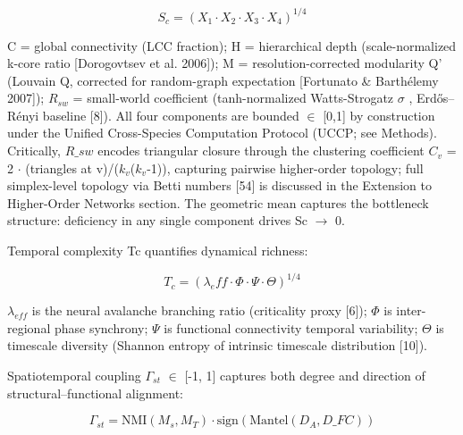\documentclass[a4paper,12pt]{article}
\begin{document}
\begin{equation}
S_c = (X_1 \cdot X_2 \cdot X_3 \cdot X_4)^{1/4} \tag{2}
\end{equation}

C = global connectivity (LCC fraction); H = hierarchical depth (scale-normalized k-core ratio [Dorogovtsev et al. 2006]); M = resolution-corrected modularity Q' (Louvain Q, corrected for random-graph expectation [Fortunato \& Barth\'elemy 2007]); $R_{sw}$ = small-world coefficient (tanh-normalized Watts-Strogatz  $\sigma$ , Erd\H{o}s--R\'enyi baseline [8]).
All four components are bounded  $\in$  [0,1] by construction under the Unified Cross-Species Computation Protocol (UCCP; see Methods).
Critically, $R\_{sw}$ encodes triangular closure through the clustering coefficient $C_{v}$ = 2 $\cdot$ (triangles at v)/($k_{v}$($k_{v}$-1)), capturing pairwise higher-order topology; full simplex-level topology via Betti numbers [54] is discussed in the Extension to Higher-Order Networks section.
The geometric mean captures the bottleneck structure: deficiency in any single component drives Sc  $\rightarrow$  0.

Temporal complexity Tc quantifies dynamical richness:

\begin{equation}
T_c = (\lambda_eff \cdot \Phi \cdot \Psi \cdot \Theta)^{1/4} \tag{3}
\end{equation}

$\lambda_{eff}$ is the neural avalanche branching ratio (criticality proxy [6]);  $\Phi$  is inter-regional phase synchrony;  $\Psi$  is functional connectivity temporal variability; $\Theta$ is timescale diversity (Shannon entropy of intrinsic timescale distribution [10]).

Spatiotemporal coupling $\Gamma_{st}$  $\in$  [-1, 1] captures both degree and direction of structural--functional alignment:

\begin{equation}
\Gamma_{st} = \text{NMI}(M_s, M_T) \cdot \text{sign}(\text{Mantel}(D_A, D\_{FC})) \tag{4}
\end{equation}
\end{document}
